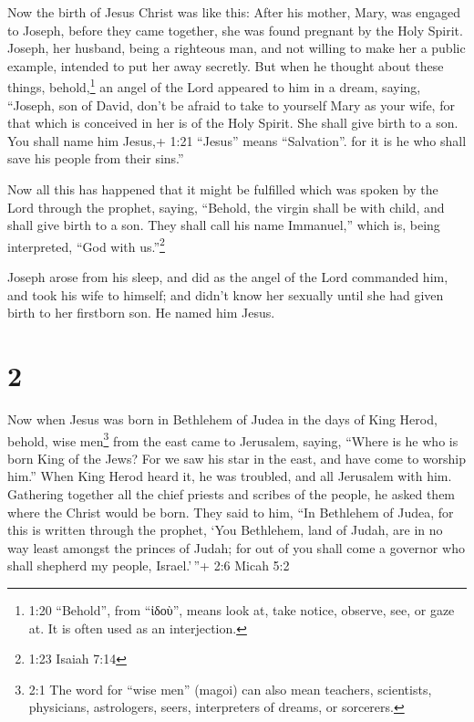 Now the birth of Jesus Christ was like this: After his
mother, Mary, was engaged to Joseph, before they came together, she was
found pregnant by the Holy Spirit.  Joseph, her husband,
being a righteous man, and not willing to make her a public example,
intended to put her away secretly.  But when he thought
about these things, behold,\footnote{1:20 ``Behold'', from ``ἰδοὺ'',
  means look at, take notice, observe, see, or gaze at. It is often used
  as an interjection.} an angel of the Lord appeared to him in a dream,
saying, ``Joseph, son of David, don't be afraid to take to yourself Mary
as your wife, for that which is conceived in her is of the Holy Spirit.
 She shall give birth to a son. You shall name him Jesus,+
1:21 ``Jesus'' means ``Salvation''. for it is he who shall save his
people from their sins.''

 Now all this has happened that it might be fulfilled which
was spoken by the Lord through the prophet, saying, 
``Behold, the virgin shall be with child, and shall give birth to a son.
They shall call his name Immanuel,'' which is, being interpreted, ``God
with us.''\footnote{1:23 Isaiah 7:14}

 Joseph arose from his sleep, and did as the angel of the
Lord commanded him, and took his wife to himself;  and
didn't know her sexually until she had given birth to her firstborn son.
He named him Jesus.

\hypertarget{section-1}{%
\section{2}\label{section-1}}

 Now when Jesus was born in Bethlehem of Judea in the days
of King Herod, behold, wise men\footnote{2:1 The word for ``wise men''
  (magoi) can also mean teachers, scientists, physicians, astrologers,
  seers, interpreters of dreams, or sorcerers.} from the east came to
Jerusalem, saying,  ``Where is he who is born King of the
Jews? For we saw his star in the east, and have come to worship him.''
 When King Herod heard it, he was troubled, and all
Jerusalem with him.  Gathering together all the chief
priests and scribes of the people, he asked them where the Christ would
be born.  They said to him, ``In Bethlehem of Judea, for
this is written through the prophet,  `You Bethlehem, land
of Judah, are in no way least amongst the princes of Judah; for out of
you shall come a governor who shall shepherd my people, Israel.'\,''+
2:6 Micah 5:2


